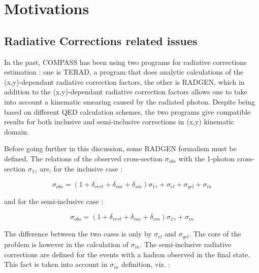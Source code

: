 
\chapter{Motivations} %

\label{ch:Motivations} %


\section{Radiative Corrections related issues}

In the past, COMPASS has been using two programs for radiative corrections estimation : one is TERAD, a program that
does analytic calculations of the (x,y)-dependant radiative correction factors, the other is RADGEN, which in addition
to the (x,y)-dependant radiative correction factors allows one to take into account a kinematic smearing caused by the
radiated photon. Despite being based on different QED calculation schemes, the two programs give compatible results for
both inclusive and semi-inclusive corrections in (x,y) kinematic domain.

Before going further in this discussion, some RADGEN formalism must be defined. The relations of the observed cross-section
$\sigma_{obs}$ with the 1-photon cross-section $\sigma_{1\gamma}$ are, for the inclusive case :

\begin{equation}
    \sigma_{obs} = (1+\delta_{vert}+\delta_{vac}+\delta_{sm})\sigma_{1\gamma}+\sigma_{el}+\sigma_{qel}+\sigma_{in}
\end{equation}

and for the semi-inclusive case :

\begin{equation}
    \sigma_{obs} = (1+\delta_{vert}+\delta_{vac}+\delta_{sm})\sigma_{1\gamma}+\sigma_{in}
\end{equation}

The difference between the two cases is only by $\sigma_{el}$ and $\sigma_{qel}$. The core of the problem is however in
the calculation of $\sigma_{in}$. The semi-inclusive radiative corrections are defined for the events with a hadron observed
in the final state. This fact is taken into account in $\sigma_{in}$ definition, viz. :

